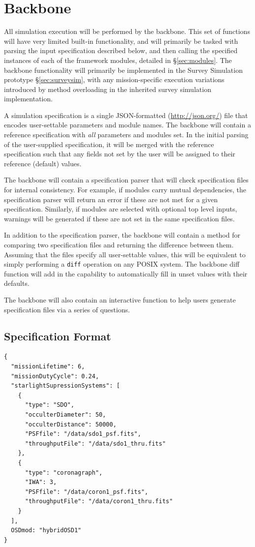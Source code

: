 \documentclass[cleanfoot]{asme2ej}
\begin{document}

\section{Backbone}
All simulation execution will be performed by the backbone.  This set of functions will have very limited built-in functionality, and will primarily be tasked with parsing the input specification described below, and then calling the specified instances of each of the framework modules, detailed in \S\ref{sec:modules}.  The backbone functionality will primarily be implemented in the Survey Simulation prototype \S\ref{sec:surveysim}, with any mission-specific execution variations introduced by method overloading in the inherited survey simulation implementation.

A simulation specification is a single JSON-formatted (\url{http://json.org/}) file that encodes user-settable parameters and module names.  The backbone will contain a reference specification with \emph{all} parameters and modules set.  In the initial parsing of the user-supplied specification, it will be merged with the reference specification such that any fields not set by the user will be assigned to their reference (default) values.   

The backbone will contain a specification parser that will check specification files for internal consistency.  For example, if modules carry mutual dependencies, the specification parser will return an error if these are not met for a given specification.  Similarly, if modules are selected with optional top level inputs, warnings will be generated if these are not set in the same specification files.

In addition to the specification parser, the backbone will contain a method for comparing two specification files and returning the difference between them.  Assuming that the files specify all user-settable values, this will be equivalent to simply performing a \verb+diff+ operation on any POSIX system.  The backbone diff function will add in the capability to automatically fill in unset values with their defaults.

The backbone will also contain an interactive function to help users generate specification files via a series of questions.

\subsection{Specification Format}
\begin{verbatim}
{
  "missionLifetime": 6,
  "missionDutyCycle": 0.24,
  "starlightSupressionSystems": [
    {
      "type": "SDO",
      "occulterDiameter": 50,
      "occulterDistance": 50000,
      "PSFfile": "/data/sdo1_psf.fits",
      "throughputFile": "/data/sdo1_thru.fits"
    },
    {
      "type": "coronagraph",
      "IWA": 3,
      "PSFfile": "/data/coron1_psf.fits",
      "throughputFile": "/data/coron1_thru.fits"
    }
  ],
  OSDmod: "hybridOSD1"
}
\end{verbatim}
\end{document}
